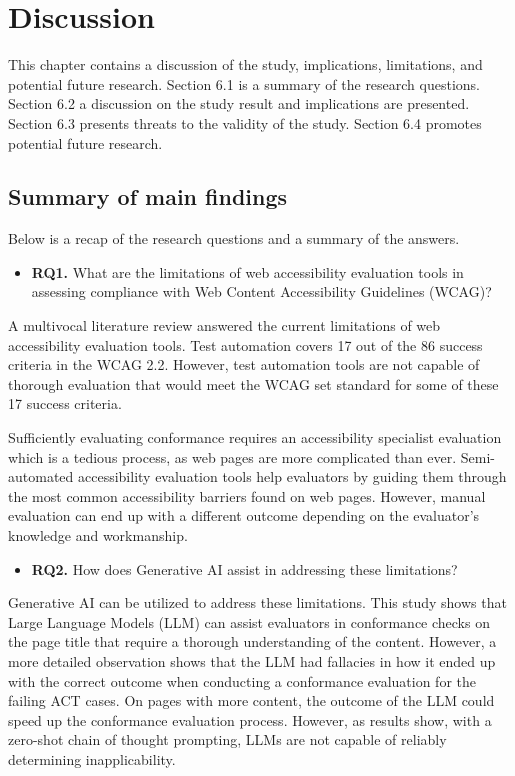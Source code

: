 \chapter{Discussion\label{discussion}}

This chapter contains a discussion of the study, implications, limitations, and potential future research. Section 6.1 is a summary of the research questions. Section 6.2 a discussion on the study result and implications are presented. Section 6.3 presents threats to the validity of the study. Section 6.4 promotes potential future research.

\section{Summary of main findings}

Below is a recap of the research questions and a summary of the answers.

\begin{itemize}
    \item \textbf{RQ1.} What are the limitations of web accessibility evaluation tools in assessing compliance with Web Content Accessibility Guidelines (WCAG)?
\end{itemize}

    A multivocal literature review answered the current limitations of web accessibility evaluation tools. Test automation covers 17 out of the 86 success criteria in the WCAG 2.2. However, test automation tools are not capable of thorough evaluation that would meet the WCAG set standard for some of these 17 success criteria. 

    Sufficiently evaluating conformance requires an accessibility specialist evaluation which is a tedious process, as web pages are more complicated than ever. Semi-automated accessibility evaluation tools help evaluators by guiding them through the most common accessibility barriers found on web pages. However, manual evaluation can end up with a different outcome depending on the evaluator's knowledge and workmanship.
    
\begin{itemize}
    \item \textbf{RQ2.} How does Generative AI assist in addressing these limitations?
\end{itemize}

    Generative AI can be utilized to address these limitations. This study shows that Large Language Models (LLM) can assist evaluators in conformance checks on the page title that require a thorough understanding of the content. However, a more detailed observation shows that the LLM had fallacies in how it ended up with the correct outcome when conducting a conformance evaluation for the failing ACT cases. On pages with more content, the outcome of the LLM could speed up the conformance evaluation process. However, as results show, with a zero-shot chain of thought prompting, LLMs are not capable of reliably determining inapplicability.

